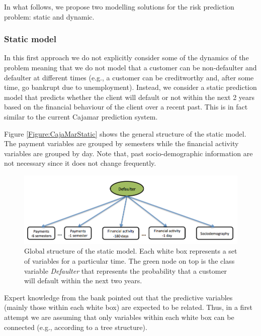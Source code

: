 In what follows, we propose two modelling solutions for the risk prediction problem: static and dynamic.

\subsubsection*{Static model} 

In this first approach we do not explicitly consider some of the dynamics of the problem meaning that we do not model that a customer can be non-defaulter and defaulter at different times (e.g., a customer can be creditworthy and, after some time, go bankrupt due to unemployment). Instead, we consider a static prediction model that predicts whether the client will default or not within the next 2 years based on the financial behaviour of the client over a recent past. This is in fact similar to the current Cajamar prediction system. 

Figure \ref{Figure:CajaMarStatic} shows the general structure of the static model. The payment variables are grouped by semesters while the financial activity variables are grouped by day. Note that, past socio-demographic information are not necessary since it does not change frequently.

\begin{figure}[htbp]
  \centering
\includegraphics[scale=0.5]{./figures/CajaMarModel0}
\caption{\label{Figure:CajaMarStatic}Global structure of the static model. Each white box represents a set of variables for a particular time. The green node on top is the class variable \emph{Defaulter} that represents the probability that a customer will default within the next two years. } 
\label{fig:CajamarStaticModel}
\end{figure}

Expert knowledge from the bank pointed out that the predictive variables (mainly those within each white box) are expected to be related. Thus, in a first attempt we are assuming that only variables within each white box can be connected (e.g., according to a tree structure).

